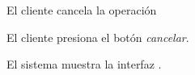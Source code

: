 {\begin{trayectoriaPrincipal}
  \end{trayectoriaPrincipal}


  \begin{trayectoriaAlternativa}
    {El cliente cancela la operación}

    \item El cliente presiona el botón \textit{cancelar}.

    \item El sistema muestra la interfaz
      .

  \end{trayectoriaAlternativa}

}
